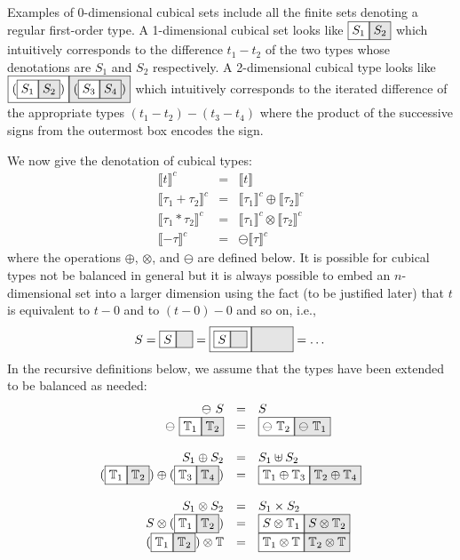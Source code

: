 \documentclass[authoryear,preprint]{sigplanconf}
\newcommand{\cubt}{\mathbb{T}}
\newcommand{\den}[1]{\llbracket #1 \rrbracket}
\newcommand{\denc}[1]{\llbracket #1 \rrbracket^c}
\newcommand{\nodet}[2]{\fcolorbox{black}{white}{$#1$}\fcolorbox{black}{gray!20}{$#2$}}
\begin{document}
Examples of 0-dimensional cubical sets include all the finite sets denoting a
regular first-order type. A 1-dimensional cubical set looks like
$\nodet{S_1}{S_2}$ which intuitively corresponds to the difference $t_1 -
t_2$ of the two types whose denotations are $S_1$ and $S_2$ respectively. A
2-dimensional cubical type looks like
$\nodet{(\nodet{S_1}{S_2})}{(\nodet{S_3}{S_4})}$ which intuitively
corresponds to the iterated difference of the appropriate types
$(t_1-t_2)-(t_3-t_4)$ where the product of the successive signs from the
outermost box encodes the sign.

We now give the denotation of cubical types:
\[\begin{array}{rcl}
\denc{t} &=& \den{t} \\
\denc{\tau_1 + \tau_2} &=& \denc{\tau_1} \oplus \denc{\tau_2} \\
\denc{\tau_1 * \tau_2} &=& \denc{\tau_1} \otimes \denc{\tau_2} \\
\denc{- \tau} &=& \ominus \denc{\tau}
\end{array}\]
where the operations $\oplus$, $\otimes$, and $\ominus$ are defined below.
It is possible for cubical types not be balanced in general but it is always
possible to embed an $n$-dimensional set into a larger dimension using the
fact (to be justified later) that $t$ is equivalent to $t-0$ and to $(t-0)-0$
and so on, i.e.,
\[
S = \nodet{S}{\phantom{S}} = 
  \nodet{\nodet{S}{\phantom{S}}}
        {\phantom{{\nodet{S}{\phantom{S}}}}} = \ldots \\
\]
In the recursive definitions below, we assume that the types have been
extended to be balanced as needed:
\[\begin{array}{rcl}
\ominus~S &=& S \\
\ominus~\nodet{\cubt_1}{\cubt_2} &=& \nodet{\ominus~\cubt_2}{\ominus~\cubt_1} \\
\\
S_1 \oplus S_2 &=& S_1 \uplus S_2 \\
(\nodet{\cubt_1}{\cubt_2}) \oplus (\nodet{\cubt_3}{\cubt_4}) &=& 
  \nodet{\cubt_1 \oplus \cubt_3}{\cubt_2 \oplus \cubt_4} \\
\\
S_1 \otimes S_2 &=& S_1 \times S_2 \\
S \otimes (\nodet{\cubt_1}{\cubt_2}) &=& 
  \nodet{S \otimes \cubt_1}{S \otimes \cubt_2} \\
(\nodet{\cubt_1}{\cubt_2}) \otimes \cubt &=& 
  \nodet{\cubt_1 \otimes \cubt}{\cubt_2 \otimes \cubt}
\end{array}\]
\end{document}
